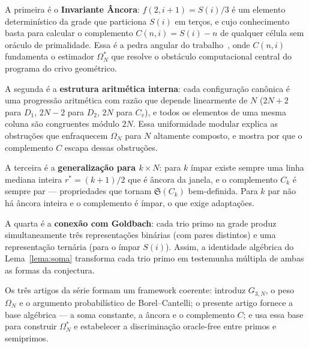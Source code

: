 \documentclass[12pt, a4paper]{article}
\begin{document}
	\medskip
	
	A primeira é o \textbf{Invariante Âncora}: $f(2,i+1)=S(i)/3$ é um elemento
	determinístico da grade que particiona $S(i)$ em terços, e cujo conhecimento
	basta para calcular o complemento $C(n,i)=S(i)-n$ de qualquer célula sem oráculo
	de primalidade. Essa é a pedra angular do trabalho~\cite{bandeira2026c}, onde
	$C(n,i)$ fundamenta o estimador $\Omega^*_N$ que resolve o obstáculo computacional
	central do programa do crivo geométrico.
	
	\medskip
	
	A segunda é a \textbf{estrutura aritmética interna}: cada configuração canônica é
	uma progressão aritmética com razão que depende linearmente de $N$ ($2N+2$ para
	$D_1$, $2N-2$ para $D_2$, $2N$ para $C_v$), e todos os elementos de uma mesma
	coluna são congruentes módulo $2N$. Essa uniformidade modular explica as obstruções
	que enfraquecem $\Omega_N$ para $N$ altamente composto, e mostra por que o
	complemento $C$ escapa dessas obstruções.
	
	\medskip
	
	A terceira é a \textbf{generalização para $k\times N$}: para $k$ ímpar existe sempre
	uma linha mediana inteira $r^*=(k+1)/2$ que é âncora da janela, e o complemento
	$C_k$ é sempre par — propriedades que tornam $\mathfrak{S}(C_k)$ bem-definida.
	Para $k$ par não há âncora inteira e o complemento é ímpar, o que exige adaptações.
	
	\medskip
	
	A quarta é a \textbf{conexão com Goldbach}: cada trio primo na grade produz
	simultaneamente três representações binárias (com pares distintos) e uma
	representação ternária (para o ímpar $S(i)$). Assim, a identidade algébrica do
	Lema~\ref{lema:soma} transforma cada trio primo em testemunha múltipla de ambas
	as formas da conjectura.
	
	\medskip
	
	Os três artigos da série formam um framework coerente: \cite{bandeira2026}
	introduz $G_{3,N}$, o peso $\Omega_N$ e o argumento probabilístico
	de Borel–Cantelli; o presente artigo fornece a base algébrica — a soma constante,
	a âncora e o complemento $C$; e \cite{bandeira2026c} usa essa base para construir
	$\Omega^*_N$ e estabelecer a discriminação oracle-free entre primos e semiprimos.
	
\end{document}
